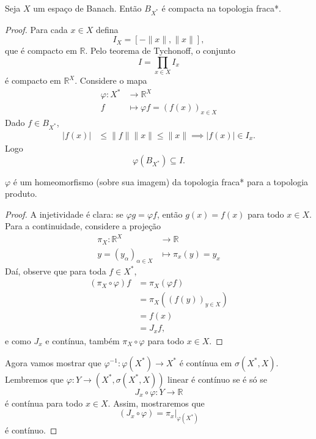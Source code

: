 \documentclass[portuguese]{article}
\theoremstyle{definition}
\newcommand{\R}{\mathbb{R}}
\begin{document}
	\begin{teo}
		Seja $X$ um espaço de Banach. Então $B_{X^*}$ é compacta na topologia fraca*.
	\end{teo}
	\begin{proof}
		Para cada $x\in X$ defina
		\[I_X=[-\| x\|,\| x\|],\]
		que é compacto em $\R$. Pelo teorema de Tychonoff, o conjunto
		\[I=\prod_{x\in X}I_x\]
		é compacto em $\R^X$. Considere o mapa
		\begin{align*}
			\varphi:X^*&\to \R^X\\
			f&\mapsto \varphi f=(f(x))_{x\in X}
		\end{align*}
		Dado $f\in B_{X^*}$,
		\begin{align*}
			|f(x)|&\leq\| f\|\| x\|\leq\| x\|\implies|f(x)|\in I_x.
		\end{align*}
		Logo
		\[\varphi(B_{X^*})\subseteq I.\]
		\begin{af*}
			$\varphi$ é um homeomorfismo (sobre sua imagem) da topologia fraca* para a topologia produto.
		\end{af*}
		\begin{proof}
			A injetividade é clara: se $\varphi g=\varphi f$, então $g(x)=f(x)$ para todo $x\in X$. Para a continuidade, considere a projeção
			\begin{align*}
				\pi_X:\R^X&\to\R\\
				y=(y_\alpha)_{\alpha\in X}&\mapsto \pi_x(y)=y_x
			\end{align*}
			Daí, observe que para toda $f\in X^*$,
			\begin{align*}
				(\pi_X\circ\varphi)f&=\pi_X(\varphi f)\\
				&=\pi_X((f(y))_{y\in X})\\
				&=f(x)\\
				&=J_xf,
			\end{align*}
			e como $J_x$ e contínua, também $\pi_X\circ\varphi$ para todo $x\in X$.
		\end{proof}
		Agora vamos mostrar que $\varphi^{-1}:\varphi(X^*)\to X^*$ é contínua em $\sigma(X^*,X)$. Lembremos que $\varphi:Y\to (X^*,\sigma(X^*,X))$ linear é contínuo se é só se
		\[J_x\circ\varphi:Y\to\R\]
		é contínua para todo $x\in X$. Assim, mostraremos que
		\[(J_x\circ \varphi)=\pi_x|_{\varphi(X^*)}\]
		é contínuo.
		

\end{proof}
\end{document}
